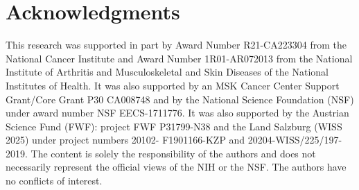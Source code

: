\documentclass[10pt,twocolumn,letterpaper]{article} %
\begin{document}
{
  \section*{Acknowledgments}

  This research was supported in part by Award Number R21-CA223304 from the National Cancer Institute and Award Number 1R01-AR072013 from the National Institute of Arthritis and Musculoskeletal and Skin Diseases of the National Institutes of Health. It was also supported by an MSK Cancer Center Support Grant/Core Grant P30 CA008748 and by the National Science Foundation (NSF) under award number NSF EECS-1711776. It was also supported by the Austrian Science Fund (FWF): project FWF P31799-N38 and the Land Salzburg (WISS 2025) under project numbers 20102- F1901166-KZP and 20204-WISS/225/197-2019. The content is solely the responsibility of the authors and does not necessarily represent the official views of the NIH or the NSF. The authors have no conflicts of interest.
}
  
{
  
  
}
    {
      
      {\small
        
        
      }
    }
\end{document}
